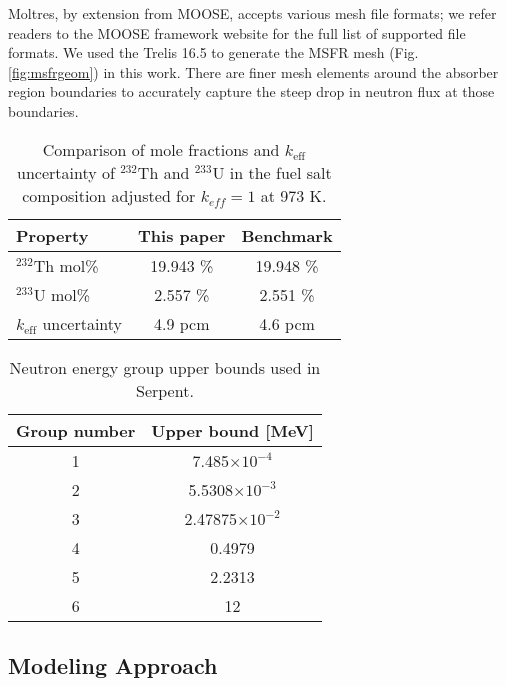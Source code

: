 Moltres, by extension from MOOSE, accepts various mesh file formats; we refer
readers to the MOOSE framework website for the full list of supported file
formats. We used the Trelis 16.5 \cite{noauthor_trelis_2018} to generate the
\gls{MSFR} mesh (Fig. \ref{fig:msfrgeom}) in this work. There are finer mesh
elements around the absorber region boundaries to accurately capture the steep
drop in neutron flux at those boundaries.
%
\begin{table}[htb!]
	\centering
    \caption{Comparison of mole fractions and $k_{\text{eff}}$ uncertainty
    of $^{232}$Th and $^{233}$U in
    the fuel salt composition adjusted for $k_{eff}=1$ at 973 K.}
\begin{tabular}{l S S}
	\hline
	\textbf{Property} & \textbf{This paper} & \textbf{Benchmark
	\cite{brovchenko_neutronic_2019}} \\
	\hline
    $^{232}$Th mol\% & 19.943 \% & 19.948 \% \\
    $^{233}$U mol\% & 2.557 \% & 2.551 \% \\
    $k_{\text{eff}}$ uncertainty & 4.9 pcm & 4.6 pcm \\
    \hline
\end{tabular}
\label{table:mole}
\end{table}
%
\begin{table}[htb!]
	\centering
	\caption{Neutron energy group upper bounds used in Serpent.}
	\begin{tabular}{c S}
		\hline
		{Group number} & {Upper bound [MeV]}\\
		 & 7.485$\times 10^{-4}$\\
		2 & 5.5308$\times 10^{-3}$\\
		3 & 2.47875$\times 10^{-2}$\\
		4 & 0.4979\\
		5 & 2.2313\\
		6 & 12\\
		\hline
	\end{tabular}
	\label{table:bound}
\end{table}
%
\subsection{Modeling Approach}

